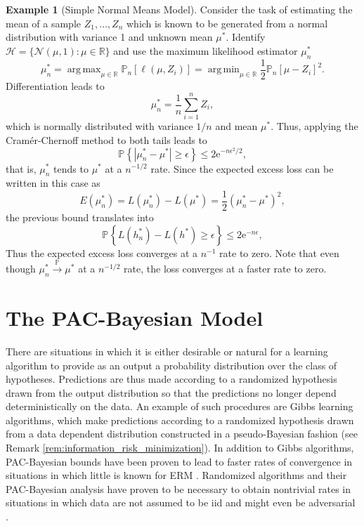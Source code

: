 \documentclass{uvamath}
\newcommand*{\reals}{\mathbb{R}}
\newcommand*{\calH}{\mathcal{H}}
\newcommand*{\calN}{\mathcal{N}}
\newcommand*{\bbP}{\mathbb{P}}
\newcommand*{\prob}[2][]{\mathbb{P}_{#1}\left\{#2\right\}}
\newcommand*{\abs}[1]{\left|#1\right|}
\newcommand*{\toinP}{\overset{\bbP}{\longrightarrow}}
\newcommand*{\rme}{\mathrm{e}}
\DeclareMathOperator*{\argmin}{arg\,min}
\DeclareMathOperator*{\argmax}{arg\,max}
\theoremstyle{remark}
\theoremstyle{definition}
\theoremstyle{definition}
\theoremstyle{definition}
\newtheorem{example}[theorem]{Example}
\theoremstyle{definition}
\theoremstyle{definition}
\begin{document}
\begin{example}[Simple Normal Means Model]\label{ex:normal_means}
  Consider the task of estimating the mean of a sample $Z_1,\dots,Z_n$
  which is known to be generated from a normal distribution with
  variance 1 and unknown mean $\mu^*$. Identify
  $\calH = \{\calN(\mu, 1) : \mu\in\reals\}$ and use the maximum
  likelihood estimator $\mu^*_n$
  \begin{equation*}
    \mu^*_n
    = \argmax_{\mu\in\reals}\bbP_n[\ell(\mu,Z_i)]
    = \argmin_{\mu\in\reals}\frac{1}{2}\bbP_n[\mu-Z_i]^2.
  \end{equation*}
  Differentiation leads to
  \begin{equation*}
    \mu^*_n = \frac{1}{n}\sum_{i=1}^nZ_i,
  \end{equation*}
  which is normally distributed with variance $1/n$ and mean
  $\mu^*$.
  Thus, applying the Cramér-Chernoff method to both tails leads to
  \begin{equation*}
    \prob{\abs{\mu^*_n - \mu^*} \geq \epsilon} \leq 2\rme^{-n\epsilon^2 / 2},
  \end{equation*}
  that is, $\mu^*_n$ tends to $\mu^*$ at a $n^{-1/2}$ rate. Since the
  expected excess loss can be written in this case as
  \begin{equation*}
    E(\mu^*_n) = L(\mu^*_n) - L(\mu^*) = \frac{1}{2}(\mu^*_n - \mu^*)^2,
  \end{equation*}
  the previous bound translates into
  \begin{equation*}
    \prob{ L(h^*_n) - L(h^*) \geq \epsilon} \leq 2\rme^{-n\epsilon},
  \end{equation*}
  Thus the expected excess loss converges at a $n^{-1}$ rate to
  zero. Note that even though $\mu^*_n\toinP\mu^*$ at a $n^{-1/2}$
  rate, the loss converges at a faster rate to zero.
\end{example}


\section{The PAC-Bayesian Model\label{sect:pac_intro}}

There are situations in which it is either desirable or natural for a
learning algorithm to provide as an output a probability distribution
over the class of hypotheses. Predictions are thus made according to a
randomized hypothesis drawn from the output distribution so that the
predictions no longer depend deterministically on the data. An example
of such procedures are Gibbs learning algorithms, which make
predictions according to a randomized hypothesis drawn from a data
dependent distribution constructed in a pseudo-Bayesian fashion (see
Remark \ref{rem:information_risk_minimization}). In addition to Gibbs
algorithms, PAC-Bayesian bounds have been proven to lead to faster
rates of convergence in situations in which little is known for ERM
\citep{audibert_fast_2009}. Randomized algorithms and their
PAC-Bayesian analysis have proven to be necessary to obtain nontrivial
rates in situations in which data are not assumed to be iid and might
even be adversarial \citep{cesa-bianchi_prediction_2006}.
\end{document}

